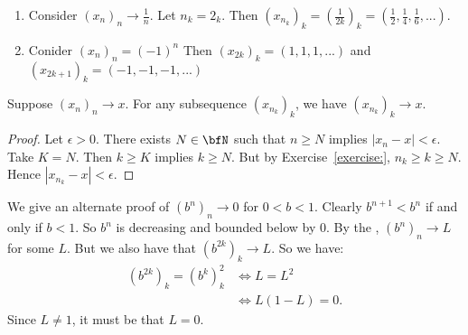     \begin{example}
        \phantom{a}
        \begin{enumerate}[label = (\arabic*)]
            \item Consider $(x_n)_n \rightarrow \frac{1}{n}$. Let $n_k = 2_k$. Then $(x_{n_k})_k = \left(\frac{1}{2k}\right)_k = \left(\frac{1}{2},\frac{1}{4},\frac{1}{6},...\right)$.
            \item Conider $(x_n)_n = (-1)^n$ Then $(x_{2k})_k = (1,1,1,...)$ and $(x_{2k+1})_k = (-1,-1,-1,...)$
        \end{enumerate}
    \end{example}

    \begin{proposition}
        Suppose $(x_n)_n \rightarrow x$. For any subsequence $(x_{n_k})_k$, we have $(x_{n_k})_k \rightarrow x$.
    \end{proposition}
        \begin{proof}
            Let $\epsilon > 0$. There exists $N \in \bfN$ such that $n \geq N$ implies $|x_n - x| < \epsilon$. Take $K = N$. Then $k \geq K$ implies $k \geq N$. But by Exercise~\ref{exercise:}, $n_k \geq k \geq N$. Hence $|x_{n_k} - x | < \epsilon$.
        \end{proof}

    \begin{example}
        We give an alternate proof of $(b^n)_n \rightarrow 0$ for $0 < b < 1$. Clearly $b^{n+1} < b^n$ if and only if $b < 1$. So $b^n$ is decreasing and bounded below by 0. By the , $(b^n)_n \rightarrow L$ for some $L$. But we also have that $(b^{2k})_k \rightarrow L$. So we have:
            \begin{equation*}
            \begin{split}
                (b^{2k})_k = (b^k)_k^2
                & \iff L = L^2 \\
                & \iff L(1-L) = 0.
            \end{split}
            \end{equation*}
        Since $L \neq 1$, it must be that $L = 0$.
    \end{example}

